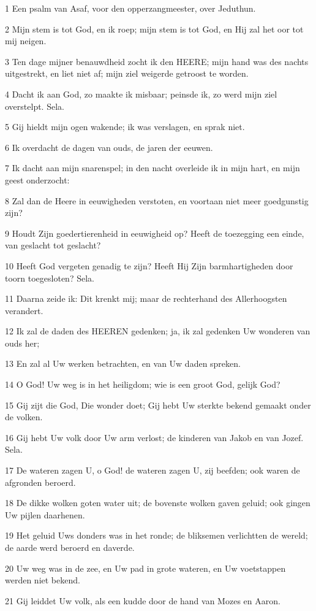 \par 1 Een psalm van Asaf, voor den opperzangmeester, over Jeduthun.
\par 2 Mijn stem is tot God, en ik roep; mijn stem is tot God, en Hij zal het oor tot mij neigen.
\par 3 Ten dage mijner benauwdheid zocht ik den HEERE; mijn hand was des nachts uitgestrekt, en liet niet af; mijn ziel weigerde getroost te worden.
\par 4 Dacht ik aan God, zo maakte ik misbaar; peinsde ik, zo werd mijn ziel overstelpt. Sela.
\par 5 Gij hieldt mijn ogen wakende; ik was verslagen, en sprak niet.
\par 6 Ik overdacht de dagen van ouds, de jaren der eeuwen.
\par 7 Ik dacht aan mijn snarenspel; in den nacht overleide ik in mijn hart, en mijn geest onderzocht:
\par 8 Zal dan de Heere in eeuwigheden verstoten, en voortaan niet meer goedgunstig zijn?
\par 9 Houdt Zijn goedertierenheid in eeuwigheid op? Heeft de toezegging een einde, van geslacht tot geslacht?
\par 10 Heeft God vergeten genadig te zijn? Heeft Hij Zijn barmhartigheden door toorn toegesloten? Sela.
\par 11 Daarna zeide ik: Dit krenkt mij; maar de rechterhand des Allerhoogsten verandert.
\par 12 Ik zal de daden des HEEREN gedenken; ja, ik zal gedenken Uw wonderen van ouds her;
\par 13 En zal al Uw werken betrachten, en van Uw daden spreken.
\par 14 O God! Uw weg is in het heiligdom; wie is een groot God, gelijk God?
\par 15 Gij zijt die God, Die wonder doet; Gij hebt Uw sterkte bekend gemaakt onder de volken.
\par 16 Gij hebt Uw volk door Uw arm verlost; de kinderen van Jakob en van Jozef. Sela.
\par 17 De wateren zagen U, o God! de wateren zagen U, zij beefden; ook waren de afgronden beroerd.
\par 18 De dikke wolken goten water uit; de bovenste wolken gaven geluid; ook gingen Uw pijlen daarhenen.
\par 19 Het geluid Uws donders was in het ronde; de bliksemen verlichtten de wereld; de aarde werd beroerd en daverde.
\par 20 Uw weg was in de zee, en Uw pad in grote wateren, en Uw voetstappen werden niet bekend.
\par 21 Gij leiddet Uw volk, als een kudde door de hand van Mozes en Aaron.

